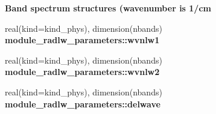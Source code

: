 \begin{Indent}\textbf{ Band spectrum structures (wavenumber is 1/cm}\par
\begin{DoxyCompactItemize}
\item 
\mbox{\label{namespacemodule__radlw__parameters_a3a7370a94889d0cbaf6057404830d978}} 
real(kind=kind\+\_\+phys), dimension(nbands) {\bfseries module\+\_\+radlw\+\_\+parameters\+::wvnlw1}
\item 
\mbox{\label{namespacemodule__radlw__parameters_ace30abd03d144096ee6b444b46081b58}} 
real(kind=kind\+\_\+phys), dimension(nbands) {\bfseries module\+\_\+radlw\+\_\+parameters\+::wvnlw2}
\item 
\mbox{\label{namespacemodule__radlw__parameters_a6ad1dff8ffc039d03c5cf3059344308e}} 
real(kind=kind\+\_\+phys), dimension(nbands) {\bfseries module\+\_\+radlw\+\_\+parameters\+::delwave}
\end{DoxyCompactItemize}
\end{Indent}
